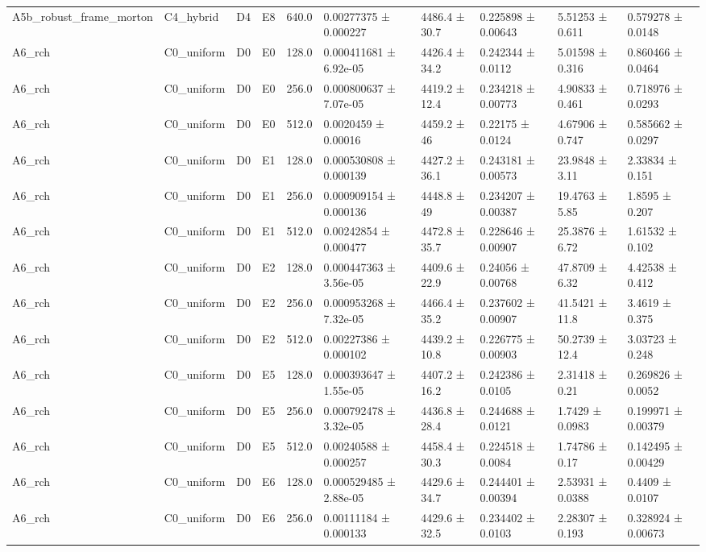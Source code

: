 \begin{table}
\begin{tabular}{llllllllll}
A5b\_robust\_frame\_morton & C4\_hybrid & D4 & E8 & 640.0 & 0.00277375 ± 0.000227 & 4486.4 ± 30.7 & 0.225898 ± 0.00643 & 5.51253 ± 0.611 & 0.579278 ± 0.0148 \\
A6\_rch & C0\_uniform & D0 & E0 & 128.0 & 0.000411681 ± 6.92e-05 & 4426.4 ± 34.2 & 0.242344 ± 0.0112 & 5.01598 ± 0.316 & 0.860466 ± 0.0464 \\
A6\_rch & C0\_uniform & D0 & E0 & 256.0 & 0.000800637 ± 7.07e-05 & 4419.2 ± 12.4 & 0.234218 ± 0.00773 & 4.90833 ± 0.461 & 0.718976 ± 0.0293 \\
A6\_rch & C0\_uniform & D0 & E0 & 512.0 & 0.0020459 ± 0.00016 & 4459.2 ± 46 & 0.22175 ± 0.0124 & 4.67906 ± 0.747 & 0.585662 ± 0.0297 \\
A6\_rch & C0\_uniform & D0 & E1 & 128.0 & 0.000530808 ± 0.000139 & 4427.2 ± 36.1 & 0.243181 ± 0.00573 & 23.9848 ± 3.11 & 2.33834 ± 0.151 \\
A6\_rch & C0\_uniform & D0 & E1 & 256.0 & 0.000909154 ± 0.000136 & 4448.8 ± 49 & 0.234207 ± 0.00387 & 19.4763 ± 5.85 & 1.8595 ± 0.207 \\
A6\_rch & C0\_uniform & D0 & E1 & 512.0 & 0.00242854 ± 0.000477 & 4472.8 ± 35.7 & 0.228646 ± 0.00907 & 25.3876 ± 6.72 & 1.61532 ± 0.102 \\
A6\_rch & C0\_uniform & D0 & E2 & 128.0 & 0.000447363 ± 3.56e-05 & 4409.6 ± 22.9 & 0.24056 ± 0.00768 & 47.8709 ± 6.32 & 4.42538 ± 0.412 \\
A6\_rch & C0\_uniform & D0 & E2 & 256.0 & 0.000953268 ± 7.32e-05 & 4466.4 ± 35.2 & 0.237602 ± 0.00907 & 41.5421 ± 11.8 & 3.4619 ± 0.375 \\
A6\_rch & C0\_uniform & D0 & E2 & 512.0 & 0.00227386 ± 0.000102 & 4439.2 ± 10.8 & 0.226775 ± 0.00903 & 50.2739 ± 12.4 & 3.03723 ± 0.248 \\
A6\_rch & C0\_uniform & D0 & E5 & 128.0 & 0.000393647 ± 1.55e-05 & 4407.2 ± 16.2 & 0.242386 ± 0.0105 & 2.31418 ± 0.21 & 0.269826 ± 0.0052 \\
A6\_rch & C0\_uniform & D0 & E5 & 256.0 & 0.000792478 ± 3.32e-05 & 4436.8 ± 28.4 & 0.244688 ± 0.0121 & 1.7429 ± 0.0983 & 0.199971 ± 0.00379 \\
A6\_rch & C0\_uniform & D0 & E5 & 512.0 & 0.00240588 ± 0.000257 & 4458.4 ± 30.3 & 0.224518 ± 0.0084 & 1.74786 ± 0.17 & 0.142495 ± 0.00429 \\
A6\_rch & C0\_uniform & D0 & E6 & 128.0 & 0.000529485 ± 2.88e-05 & 4429.6 ± 34.7 & 0.244401 ± 0.00394 & 2.53931 ± 0.0388 & 0.4409 ± 0.0107 \\
A6\_rch & C0\_uniform & D0 & E6 & 256.0 & 0.00111184 ± 0.000133 & 4429.6 ± 32.5 & 0.234402 ± 0.0103 & 2.28307 ± 0.193 & 0.328924 ± 0.00673 \\

\end{tabular}
\end{table}
